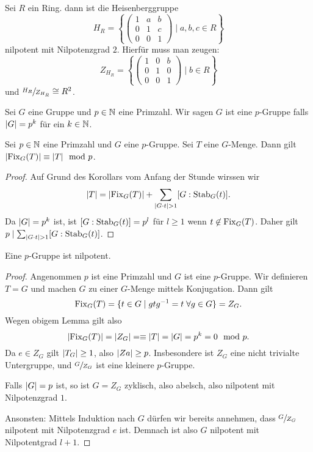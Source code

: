 \begin{eg}
	Sei $R$ ein Ring. dann ist die Heisenberggruppe
	\[
	H_{R} = \left\{ \begin{pmatrix} 
			1 & a & b\\ 0 & 1 & c\\ 0 & 0 & 1
	\end{pmatrix} \mid a,b,c \in R \right\} 
	\] 
	nilpotent mit Nilpotenzgrad $2$.
	Hierfür muss man zeugen:
	\[
	Z_{H_{R}} = \left\{ \begin{pmatrix} 
			1 & 0 & b\\ 0 & 1 & 0\\ 0 & 0 &1
	\end{pmatrix} \mid b \in R \right\} 
	\] 
	und $\sfrac{H_{R}}{Z_{H_{R}}} \cong R^2$.
\end{eg}

\begin{definition}
	Sei $G$ eine Gruppe und $p \in \mathbb{N}$ eine Primzahl.
	Wir sagen $G$ ist eine $p$-Gruppe falls $\abs{G} = p^{k}$ für ein $k \in \mathbb{N}$.
\end{definition}

\begin{lemma}
	Sei $p \in \mathbb{N}$ eine Primzahl und $G$ eine $p$-Gruppe.
	Sei $T$ eine $G$-Menge. Dann gilt $\abs{\operatorname{Fix}_{G}(T)} \equiv \abs{T} \mod p$.
\end{lemma}

\begin{proof}
	Auf Grund des Korollars vom Anfang der Stunde wirssen wir
	\[
		\abs{T} = \abs{\operatorname{Fix}_{G}(T)} + \sum_{\abs{G \cdot t} > 1} [G : \operatorname{Stab}_{G}(t)]
	.\] 
	Da $\abs{G} = p^{k}$ ist, ist $[ G : \operatorname{Stab}_{G}(t) ] = p^{l}$ für $l \geq 1$ wenn $t \not\in \operatorname{Fix}_{G}(T)$.
	Daher gilt $p \mid \sum_{\abs{G \cdot t} > 1} [G : \operatorname{Stab}_{G}(t)]$.
\end{proof}

\begin{theorem}
	Eine $p$-Gruppe ist nilpotent.
\end{theorem}

\begin{proof}
	Angenommen $p$ ist eine Primzahl und $G$ ist eine $p$-Gruppe.
	Wir definieren $T = G$ und machen $G$ zu einer $G$-Menge mittels Konjugation. Dann gilt
	\[
		\on{Fix}_{G}(T) = \{t \in G \mid g t g^{-1} = t \forall g \in G\} = Z_{G}
	.\] 
	Wegen obigem Lemma gilt also
	\[
		\abs{\operatorname{Fix}_{G}(T)} = \abs{Z_{G}} = \equiv \abs{T} = \abs{G} = p^{k} = 0 \mod p
	.\] 
	Da $e \in Z_{G}$ gilt $\abs{T_{G}} \geq 1$, also $\abs{Za} \geq p$.
	Insbesondere ist $Z_{G}$ eine nicht trivialte Untergruppe, und
	$\sfrac{G}{Z_{G}}$ ist eine kleinere $p$-Gruppe.

	Falls $\abs{G} = p$ ist, so ist $G = Z_{G}$ zyklisch, also abelsch, also nilpotent mit Nilpotenzgrad $1$.
	
	Ansonsten:
	Mittels Induktion nach  $G$ dürfen wir bereits annehmen, dass $\sfrac{G}{Z_{G}}$ nilpotent mit Nilpotenzgrad $e$ ist.
	Demnach ist also $G$ nilpotent mit Nilpotentgrad $l+1$.
\end{proof}


